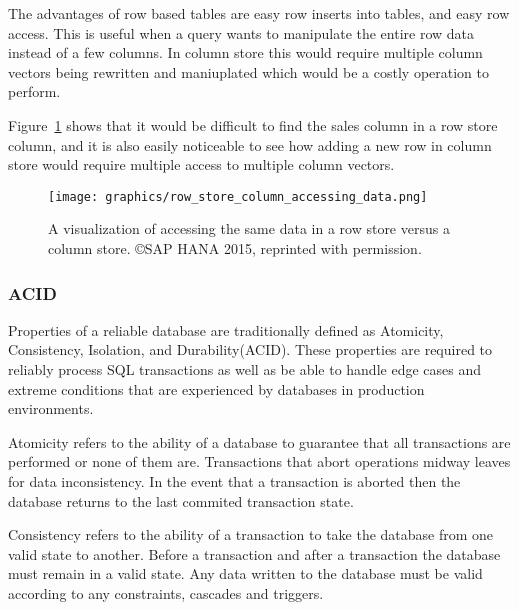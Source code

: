 \documentclass[letterpaper, 11pt]{article}
\begin{document}
The advantages of row based tables are easy row inserts into tables, and easy row access. This is useful when a query
wants to manipulate the entire row data instead of a few columns. In column store this would require multiple column vectors
being rewritten and maniuplated which would be a costly operation to perform.
\par\vspace{\baselineskip}

Figure~\ref{fig:row_col_access_data} shows that it would be 
difficult to find the sales column in a row store column, and it is also easily
noticeable to see how adding a new row in column store would require multiple
access to multiple column vectors.
\par\vspace{\baselineskip}

\begin{figure}[H]
  \centering
  \texttt{[image: graphics/row\_store\_column\_accessing\_data.png]}
  \caption{A visualization of accessing the same data in a row store versus a column store. \copyright SAP HANA 2015, reprinted with permission.\cite{saphana}}
  \label{fig:row_col_access_data}
\end{figure}

\subsubsection{ACID}
Properties of a reliable database are traditionally defined as Atomicity, Consistency, Isolation, 
and Durability(ACID). These properties are required to reliably process SQL transactions as well as
be able to handle edge cases and extreme conditions that are experienced by databases in 
production environments.
\par\vspace{\baselineskip}

Atomicity refers to the ability of a database to guarantee that all transactions
are performed or none of them are. Transactions that abort operations midway leaves
for data inconsistency. In the event that a transaction is aborted then the database
returns to the last commited transaction state.
\par\vspace{\baselineskip}

Consistency refers to the ability of a transaction to take the database from one valid state
to another. Before a transaction and after a transaction the database must remain in a valid state.
Any data written to the database must be valid according to any constraints, cascades and triggers.
\par\vspace{\baselineskip}
\end{document}
